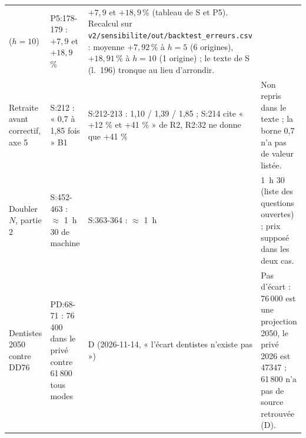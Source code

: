 {\begin{longtable}{@{}p{2.9cm}p{3.5cm}p{3.5cm}p{4.7cm}@{}}
  ($h = 10$) & P5:178-179 : $+7{,}9$ et $+18{,}9$\,\% & $+7{,}9$ et $+18{,}9$\,\% (tableau de S et P5). Recalcul sur
  \texttt{v2/sensibilite/out/backtest\_erreurs.csv} : moyenne $+7{,}92$\,\% à $h = 5$ (6 origines), $+18{,}91$\,\% à
  $h = 10$ (1 origine) ; le texte de S (l.~196) tronque au lieu d'arrondir. \\
Retraite avant correctif, axe 5 & S:212 : « 0,7 à 1,85 fois » B1 & S:212-213 : 1,10 / 1,39 / 1,85 ; S:214 cite « +12
  \% et +41 \% » de R2, R2:32 ne donne que +41 \% & Non repris dans le texte ; la borne 0,7 n'a pas de valeur listée.
  \\
Doubler $N$, partie 2 & S:452-463 : $\approx$ 1~h 30 de machine & S:363-364 : $\approx$ 1~h & 1~h 30 (liste des
  questions ouvertes) ; prix supposé dans les deux cas. \\
Dentistes 2050 contre DD76 & PD:68-71 : 76\,400 dans le privé contre 61\,800 tous modes & D (2026-11-14,
  « l'écart dentistes n'existe pas ») & Pas d'écart : 76\,000 est une projection 2050, le privé 2026 est
  \num{47347} ; 61\,800 n'a pas de source retrouvée (D). \\
\end{longtable}
}
\endgroup
